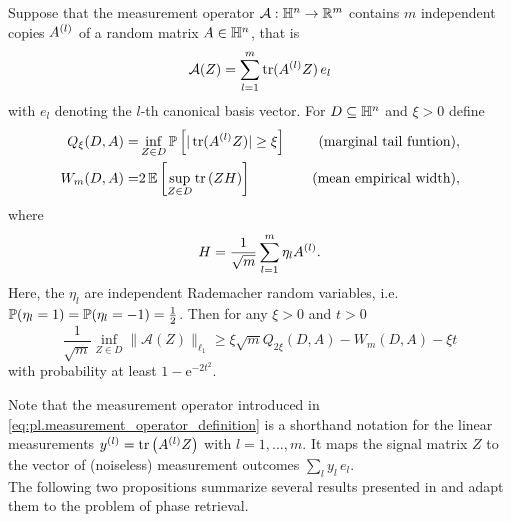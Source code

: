\begin{theorem}%
  \label{thm:mendelson}
  Suppose that the measurement operator $\mathcal{A}:\mathbb{H}^n \to \mathbb{R}^m$ contains $m$ independent copies $A^{(l)}$ of a random matrix $ A \in \mathbb{H}^n$, that is
  \[
    \label{eq:pl.measurement_operator_definition}
    \mathcal{A}(Z) = \sum_{l=1}^m \operatorname{tr} (A^{(l)}  Z) \,  {e_l}
  \]
  with $e_l$ denoting the $l$-th canonical basis vector.
  For $D \subseteq \mathbb{H}^n$ and $\xi >0$ define
  \begin{align}
    Q_\xi (D,  A) =& \inf_{ Z \in D}\mathbb{P} \left[ | \operatorname{tr} (A^{(l)}  Z) | \geq \xi \right] \quad &\textrm{(marginal tail funtion)}, \label{eq:pl.marginal_tail_function}\\
    W_m (D,  A) =& 2 \, \mathbb{E} \left[ \sup_{ Z \in D} \operatorname{tr} \left(  Z  H \right) \right] \quad &\textrm{(mean empirical width)},
  \end{align}
  where
  \[
    H= \frac{1}{\sqrt{m}} \sum_{l=1}^m \eta_l A^{(l)}.
  \]
  Here, the $\eta_l$ are independent Rademacher random variables, i.e.\ $\mathbb{P}(\eta_l = 1) = \mathbb{P}(\eta_l=-1) = \frac{1}{2}$.
  Then for any $\xi >0$ and $t >0$
  \[
    \frac{1}{\sqrt{m}}\inf_{ Z \in D} \| \mathcal{A}( Z) \|_{\ell_1} \geq \xi \sqrt{m} Q_{2\xi}(D,  A) -  W_m (D,  A)-\xi t \label{eq:pl.mendelson}
  \]
  with probability at least $1-\mathrm{e}^{-2t^2}$.
\end{theorem}

Note that the measurement operator introduced in \cref{eq:pl.measurement_operator_definition} is a shorthand notation for the linear measurements $y^{(l)} = \operatorname{tr}  \left( A^{(l)}  Z \right)$ with $l=1,\ldots,m$.
It maps the signal matrix $Z$ to the vector of (noiseless) measurement outcomes $\sum_l y_l \, {e_l}$.\\


The following two propositions summarize several results presented in \cite{Kabanava_2015_Stable} and adapt them to the problem of phase retrieval.

